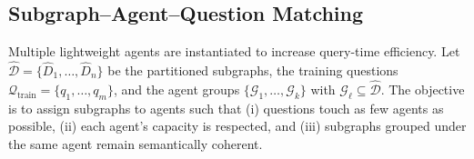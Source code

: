 \documentclass[sigconf]{acmart}
\begin{document}

    
    


\subsection{Subgraph--Agent--Question Matching}
\label{text:3-2}

Multiple lightweight agents are instantiated to increase query-time efficiency.
Let \(\hat{\mathcal{D}}=\{\hat{D}_1,\ldots,\hat{D}_n\}\) be the partitioned subgraphs,
the training questions \(\mathcal{Q}_{\text{train}}=\{q_1,\ldots,q_m\}\),
and the agent groups \(\{\mathcal{G}_1,\ldots,\mathcal{G}_k\}\) with
\(\mathcal{G}_\ell \subseteq \hat{\mathcal{D}}\).
The objective is to assign subgraphs to agents such that
(i) questions touch as few agents as possible,
(ii) each agent's capacity is respected, and
(iii) subgraphs grouped under the same agent remain semantically coherent.
\end{document}
